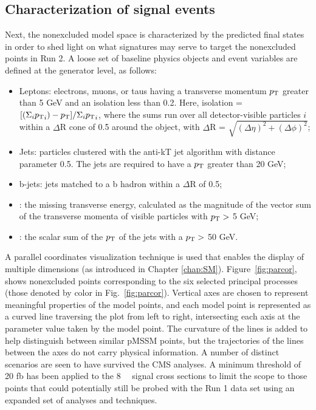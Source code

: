 \subsection{Characterization of signal events}
Next, the nonexcluded model space is characterized by the predicted
final states in order to shed light on what signatures may serve to target the nonexcluded points in Run 2.  A loose set of baseline physics objects and event 
variables are defined at the generator level, as follows:
\begin{itemize}
\item Leptons: electrons, muons, or taus having a transverse momentum $p_{\rm T}$ greater than 5 GeV and an isolation less than 0.2. Here, isolation  =
$[(\Sigma_{i}{p_{\rm T}}_i) - p_{\rm T}]/\Sigma_{i}{p_{\rm T}}_i$,
where the sums run over all detector-visible particles $i$ within a
$\Delta$R cone of 0.5 around the object, with $\Delta$R = $\sqrt{(\Delta\eta)^2+(\Delta\phi)^2}$;
\item Jets: particles clustered with the anti-kT jet algorithm \cite{Cacciari:2008gp} with distance parameter 0.5. The jets are required to have a $p_{\rm T}$ greater than 20 GeV;
\item b-jets: jets matched to a b hadron within a $\Delta$R of 0.5;
\item \MET{}: the missing transverse energy, calculated as the magnitude
  of the vector sum of the transverse momenta of
 visible particles with $p_{\rm T} >$ 5 GeV; 
\item \HT{}: the scalar sum of the $p_{\rm T}$ of the jets with
  a $p_{\rm T}>$ 50 GeV.
\end{itemize}

A parallel coordinates visualization technique is used that enables the
display of multiple dimensions (as introduced in Chapter \ref{chap:SM}). Figure~\ref{fig:parcor},
shows nonexcluded points corresponding to the six selected
principal processes (those denoted by color in Fig.~\ref{fig:parcor}).
Vertical axes are chosen to represent meaningful properties of the model
points, and each model point is represented as a curved line traversing the plot from left to right, intersecting each axis at the parameter value taken by the model point. The curvature of the lines is added to help distinguish between similar pMSSM points, but the trajectories of the lines between the axes do not carry physical information. A number of distinct scenarios are seen to have survived the CMS
analyses.  A minimum threshold of 20 fb has been applied to the 8~\TeV~ signal
cross sections to limit the scope to those
points that could potentially still be probed with the Run 1 data set
using an expanded set of analyses and techniques.


